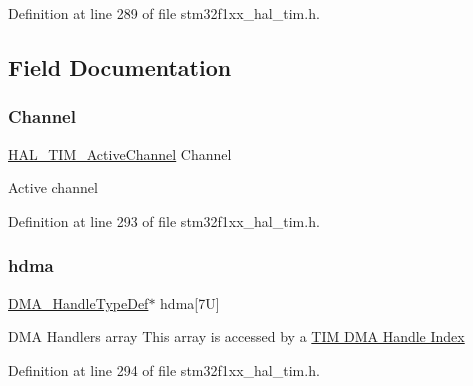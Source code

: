 Definition at line 289 of file stm32f1xx\+\_\+hal\+\_\+tim.\+h.



\subsection{Field Documentation}
\mbox{\label{struct_t_i_m___handle_type_def_a57eac61d1d06cad73bdd26dabe961753}} 
\subsubsection{\texorpdfstring{Channel}{Channel}}
{\footnotesize\ttfamily \hyperlink{group___t_i_m___exported___types_gaa3fa7bcbb4707f1151ccfc90a8cf9706}{H\+A\+L\+\_\+\+T\+I\+M\+\_\+\+Active\+Channel} Channel}

Active channel 

Definition at line 293 of file stm32f1xx\+\_\+hal\+\_\+tim.\+h.

\mbox{\label{struct_t_i_m___handle_type_def_a9a87ff723657cc3d6a9556f0efdcbef1}} 
\subsubsection{\texorpdfstring{hdma}{hdma}}
{\footnotesize\ttfamily \hyperlink{group___d_m_a___exported___types_ga92b907d56a9c29b93d46782a7a04f91e}{D\+M\+A\+\_\+\+Handle\+Type\+Def}$\ast$ hdma\mbox{[}7\+U\mbox{]}}

D\+MA Handlers array This array is accessed by a \hyperlink{group___t_i_m___d_m_a___handle__index}{T\+IM D\+MA Handle Index} 

Definition at line 294 of file stm32f1xx\+\_\+hal\+\_\+tim.\+h.

\mbox{\label{struct_t_i_m___handle_type_def_a21046dd4833b51c8e3f5c82ea134d03c}} 
